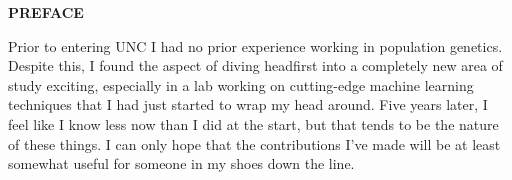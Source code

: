 \begin{center}
{\Large \textbf{PREFACE}}
\end{center}

Prior to entering UNC I had no prior experience working in population genetics. Despite this, I found the aspect of diving headfirst into a completely new area of study exciting, especially in a lab working on cutting-edge machine learning techniques that I had just started to wrap my head around. Five years later, I feel like I know less now than I did at the start, but that tends to be the nature of these things. I can only hope that the contributions I've made will be at least somewhat useful for someone in my shoes down the line.
\tbw


\clearpage
